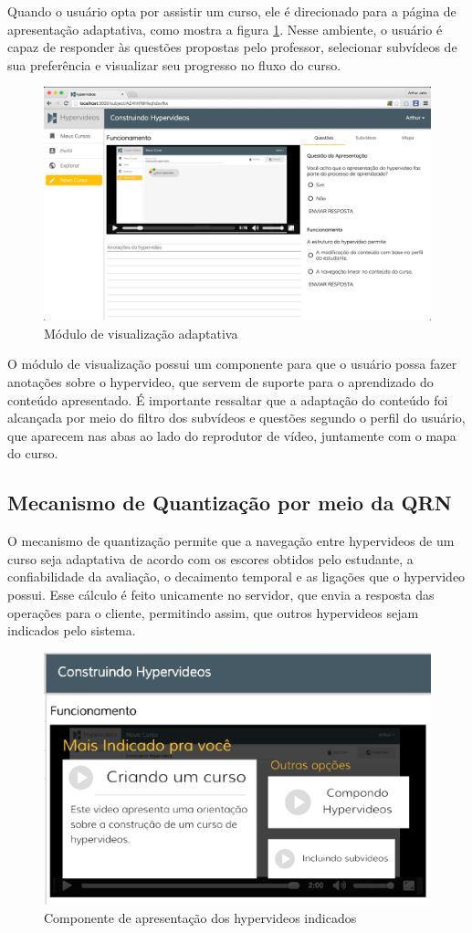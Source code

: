 Quando o usuário opta por assistir um curso, ele é direcionado para a página de apresentação adaptativa, como mostra a figura \ref{fig:apresentar}. Nesse ambiente, o usuário é capaz de responder às questões propostas pelo professor, selecionar subvídeos de sua preferência e visualizar seu progresso no fluxo do curso.

\begin{figure}[h!]
  	\centering
  	\includegraphics[width=.9\linewidth]{figuras/apresentar.eps}
  	\caption{Módulo de visualização adaptativa}
  	\label{fig:apresentar}
\end{figure}

O módulo de visualização possui um componente para que o usuário possa fazer anotações sobre o hypervideo, que servem de suporte para o aprendizado do conteúdo apresentado. É importante ressaltar que a adaptação do conteúdo foi alcançada por meio do filtro dos subvídeos e questões segundo o perfil do usuário, que aparecem nas abas ao lado do reprodutor de vídeo, juntamente com o mapa do curso.

\subsection{Mecanismo de Quantização por meio da QRN}

O mecanismo de quantização permite que a navegação entre hypervideos de um curso seja adaptativa de acordo com os escores obtidos pelo estudante, a confiabilidade da avaliação, o decaimento temporal e as ligações que o hypervideo possui. Esse cálculo é feito unicamente no servidor, que envia a resposta das operações para o cliente, permitindo assim, que outros hypervideos sejam indicados pelo sistema. 

\begin{figure}[h!]
  	\centering
  	\includegraphics[width=.5\linewidth]{figuras/quantizacao.eps}
  	\caption{Componente de apresentação dos hypervideos indicados}
  	\label{fig:quantizacao}
\end{figure}

